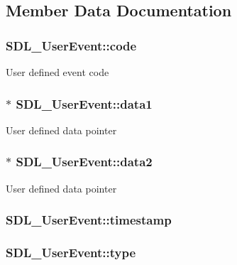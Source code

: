 \subsection{Member Data Documentation}
\hypertarget{struct_s_d_l___user_event_aef47976781ee82b527a353c5acfa0a34}{
\subsubsection[{code}]{ S\-D\-L\-\_\-\-User\-Event\-::code}}\label{struct_s_d_l___user_event_aef47976781ee82b527a353c5acfa0a34}
User defined event code \hypertarget{struct_s_d_l___user_event_ab2893a12be2f97195f16463a23107913}{
\subsubsection[{data1}]{$\ast$ S\-D\-L\-\_\-\-User\-Event\-::data1}}\label{struct_s_d_l___user_event_ab2893a12be2f97195f16463a23107913}
User defined data pointer \hypertarget{struct_s_d_l___user_event_aae4dbf65c34d654c9edf519eb061b7cf}{
\subsubsection[{data2}]{$\ast$ S\-D\-L\-\_\-\-User\-Event\-::data2}}\label{struct_s_d_l___user_event_aae4dbf65c34d654c9edf519eb061b7cf}
User defined data pointer \hypertarget{struct_s_d_l___user_event_adbf1d34c73138a0c549310e5d4ad0c35}{
\subsubsection[{timestamp}]{ S\-D\-L\-\_\-\-User\-Event\-::timestamp}}\label{struct_s_d_l___user_event_adbf1d34c73138a0c549310e5d4ad0c35}
\hypertarget{struct_s_d_l___user_event_ab7afa8b98dbd7b52bef41155e10f7340}{
\subsubsection[{type}]{ S\-D\-L\-\_\-\-User\-Event\-::type}}\label{struct_s_d_l___user_event_ab7afa8b98dbd7b52bef41155e10f7340}
